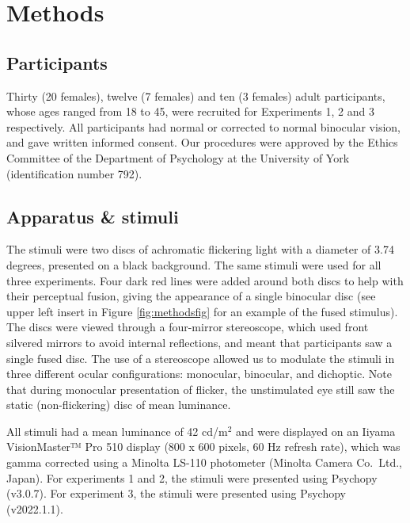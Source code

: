 \documentclass[
]{article}
\begin{document}
\hypertarget{methods}{%
\section{Methods}\label{methods}}

\hypertarget{participants}{%
\subsection{Participants}\label{participants}}

Thirty (20 females), twelve (7 females) and ten (3 females) adult participants, whose ages ranged from 18 to 45, were recruited for Experiments 1, 2 and 3 respectively. All participants had normal or corrected to normal binocular vision, and gave written informed consent. Our procedures were approved by the Ethics Committee of the Department of Psychology at the University of York (identification number 792).

\hypertarget{apparatus-stimuli}{%
\subsection{Apparatus \& stimuli}\label{apparatus-stimuli}}

The stimuli were two discs of achromatic flickering light with a diameter of 3.74 degrees, presented on a black background. The same stimuli were used for all three experiments. Four dark red lines were added around both discs to help with their perceptual fusion, giving the appearance of a single binocular disc (see upper left insert in Figure \ref{fig:methodsfig} for an example of the fused stimulus). The discs were viewed through a four-mirror stereoscope, which used front silvered mirrors to avoid internal reflections, and meant that participants saw a single fused disc. The use of a stereoscope allowed us to modulate the stimuli in three different ocular configurations: monocular, binocular, and dichoptic. Note that during monocular presentation of flicker, the unstimulated eye still saw the static (non-flickering) disc of mean luminance.

All stimuli had a mean luminance of 42 cd/m\(^2\) and were displayed on an Iiyama VisionMaster™ Pro 510 display (800 x 600 pixels, 60 Hz refresh rate), which was gamma corrected using a Minolta LS-110 photometer (Minolta Camera Co.~Ltd., Japan). For experiments 1 and 2, the stimuli were presented using Psychopy (v3.0.7). For experiment 3, the stimuli were presented using Psychopy (v2022.1.1).
\end{document}
